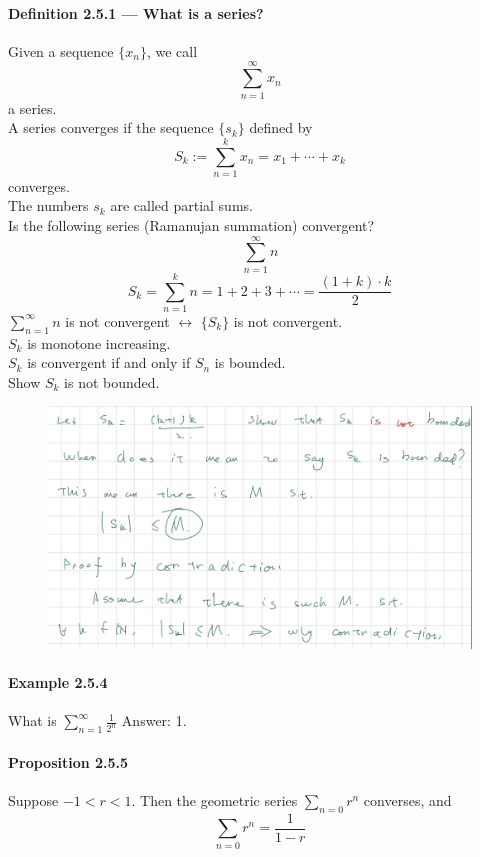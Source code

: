 \documentclass{article}
\begin{document}
\paragraph{Definition 2.5.1 — What is a series?}
Given a sequence $\{x_n\}$, we call $$\sum_{n=1}^{\infty}x_n$$ a series.\\
A series converges if the sequence $\{s_k\}$ defined by
$$S_k:=\sum_{n=1}^kx_n=x_1+\cdots+x_k$$ converges.\\
The numbers $s_k$ are called partial sums.\\
Is the following series (Ramanujan summation) convergent?
$$\sum_{n=1}^{\infty}n$$
$$S_k=\sum_{n=1}^{k}n=1+2+3+\cdots=\frac{(1+k)\cdot k}{2}$$
$\sum_{n=1}^{\infty}n$ is not convergent $\leftrightarrow$ $\{S_k\}$ is not convergent.\\
$S_k$ is monotone increasing.\\
$S_k$ is convergent if and only if $S_n$ is bounded.\\
Show $S_k$ is not bounded.\\
\begin{figure}[H]
    \centering
    \includegraphics{0135}
\end{figure}
\paragraph{Example 2.5.4}
What is $\sum_{n=1}^{\infty}\frac{1}{2^n}$ Answer: 1.
\paragraph{Proposition 2.5.5}
Suppose $-1<r<1$. Then the geometric series $\sum_{n=0}r^n$ converses, and $$\sum_{n=0}r^n=\frac{1}{1-r}$$
\end{document}
